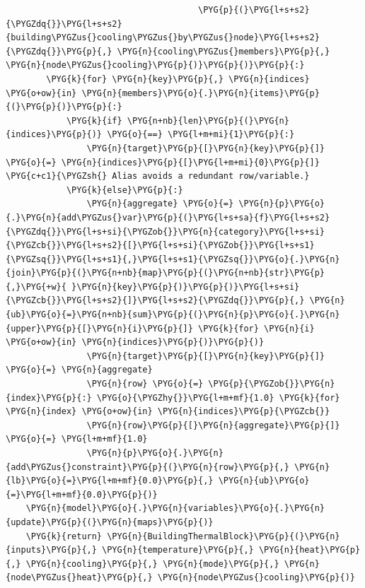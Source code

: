 \begin{Verbatim}
                                      \PYG{p}{(}\PYG{l+s+s2}{\PYGZdq{}}\PYG{l+s+s2}{building\PYGZus{}cooling\PYGZus{}by\PYGZus{}node}\PYG{l+s+s2}{\PYGZdq{}}\PYG{p}{,} \PYG{n}{cooling\PYGZus{}members}\PYG{p}{,} \PYG{n}{node\PYGZus{}cooling}\PYG{p}{)}\PYG{p}{)}\PYG{p}{:}
        \PYG{k}{for} \PYG{n}{key}\PYG{p}{,} \PYG{n}{indices} \PYG{o+ow}{in} \PYG{n}{members}\PYG{o}{.}\PYG{n}{items}\PYG{p}{(}\PYG{p}{)}\PYG{p}{:}
            \PYG{k}{if} \PYG{n+nb}{len}\PYG{p}{(}\PYG{n}{indices}\PYG{p}{)} \PYG{o}{==} \PYG{l+m+mi}{1}\PYG{p}{:}
                \PYG{n}{target}\PYG{p}{[}\PYG{n}{key}\PYG{p}{]} \PYG{o}{=} \PYG{n}{indices}\PYG{p}{[}\PYG{l+m+mi}{0}\PYG{p}{]}  \PYG{c+c1}{\PYGZsh{} Alias avoids a redundant row/variable.}
            \PYG{k}{else}\PYG{p}{:}
                \PYG{n}{aggregate} \PYG{o}{=} \PYG{n}{p}\PYG{o}{.}\PYG{n}{add\PYGZus{}var}\PYG{p}{(}\PYG{l+s+sa}{f}\PYG{l+s+s2}{\PYGZdq{}}\PYG{l+s+si}{\PYGZob{}}\PYG{n}{category}\PYG{l+s+si}{\PYGZcb{}}\PYG{l+s+s2}{[}\PYG{l+s+si}{\PYGZob{}}\PYG{l+s+s1}{\PYGZsq{}}\PYG{l+s+s1}{,}\PYG{l+s+s1}{\PYGZsq{}}\PYG{o}{.}\PYG{n}{join}\PYG{p}{(}\PYG{n+nb}{map}\PYG{p}{(}\PYG{n+nb}{str}\PYG{p}{,}\PYG{+w}{ }\PYG{n}{key}\PYG{p}{)}\PYG{p}{)}\PYG{l+s+si}{\PYGZcb{}}\PYG{l+s+s2}{]}\PYG{l+s+s2}{\PYGZdq{}}\PYG{p}{,} \PYG{n}{ub}\PYG{o}{=}\PYG{n+nb}{sum}\PYG{p}{(}\PYG{n}{p}\PYG{o}{.}\PYG{n}{upper}\PYG{p}{[}\PYG{n}{i}\PYG{p}{]} \PYG{k}{for} \PYG{n}{i} \PYG{o+ow}{in} \PYG{n}{indices}\PYG{p}{)}\PYG{p}{)}
                \PYG{n}{target}\PYG{p}{[}\PYG{n}{key}\PYG{p}{]} \PYG{o}{=} \PYG{n}{aggregate}
                \PYG{n}{row} \PYG{o}{=} \PYG{p}{\PYGZob{}}\PYG{n}{index}\PYG{p}{:} \PYG{o}{\PYGZhy{}}\PYG{l+m+mf}{1.0} \PYG{k}{for} \PYG{n}{index} \PYG{o+ow}{in} \PYG{n}{indices}\PYG{p}{\PYGZcb{}}
                \PYG{n}{row}\PYG{p}{[}\PYG{n}{aggregate}\PYG{p}{]} \PYG{o}{=} \PYG{l+m+mf}{1.0}
                \PYG{n}{p}\PYG{o}{.}\PYG{n}{add\PYGZus{}constraint}\PYG{p}{(}\PYG{n}{row}\PYG{p}{,} \PYG{n}{lb}\PYG{o}{=}\PYG{l+m+mf}{0.0}\PYG{p}{,} \PYG{n}{ub}\PYG{o}{=}\PYG{l+m+mf}{0.0}\PYG{p}{)}
    \PYG{n}{model}\PYG{o}{.}\PYG{n}{variables}\PYG{o}{.}\PYG{n}{update}\PYG{p}{(}\PYG{n}{maps}\PYG{p}{)}
    \PYG{k}{return} \PYG{n}{BuildingThermalBlock}\PYG{p}{(}\PYG{n}{inputs}\PYG{p}{,} \PYG{n}{temperature}\PYG{p}{,} \PYG{n}{heat}\PYG{p}{,} \PYG{n}{cooling}\PYG{p}{,} \PYG{n}{mode}\PYG{p}{,} \PYG{n}{node\PYGZus{}heat}\PYG{p}{,} \PYG{n}{node\PYGZus{}cooling}\PYG{p}{)}
\end{Verbatim}
